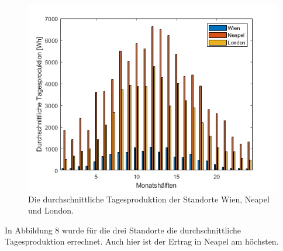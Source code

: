\documentclass[a4paper,12pt]{article}
\begin{document}
	\begin{figure}[H]
		\centering
		\includegraphics[width=12cm]{img/results/StandortVergleichTagesproduktion}
		\caption{Die durchschnittliche Tagesproduktion der Standorte Wien, Neapel und London.}
	\end{figure}
	In Abbildung 8 wurde für die drei Standorte die durchschnittliche Tagesproduktion errechnet. Auch hier ist der Ertrag in Neapel am höchsten.
\end{document}
